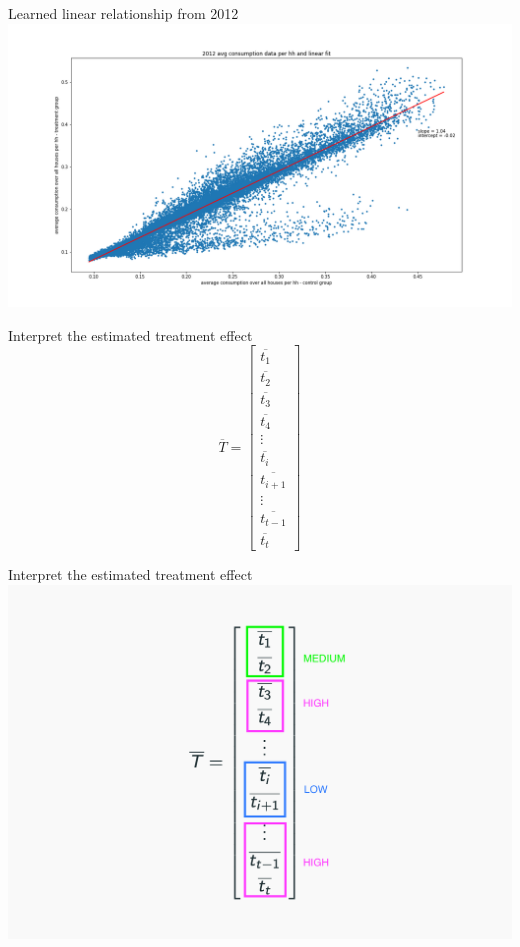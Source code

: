 \documentclass{beamer}
\begin{document}
\begin{frame}{Learned linear relationship from 2012}
  \centering
  \includegraphics[width=1\textwidth]{images/2012-avg.png}
\end{frame}

\begin{frame}{Interpret the estimated treatment effect}
    $$
    \overline{T} = \left[\begin{array}{cccc}
    \overline{t_{1}} \\
    \overline{t_{2}} \\
    \overline{t_{3}} \\
    \overline{t_{4}} \\
    \vdots \\
    \overline{t_{i}} \\
    \overline{t_{i+1}} \\
    \vdots \\
    \overline{t_{t-1}} \\
    \overline{t_{t}}
    \end{array}\right]
    $$
\end{frame}

\begin{frame}{Interpret the estimated treatment effect}
  \centering
  \includegraphics[width=1\textwidth]{images/linear-treatment-hours.png}
\end{frame}
\end{document}
